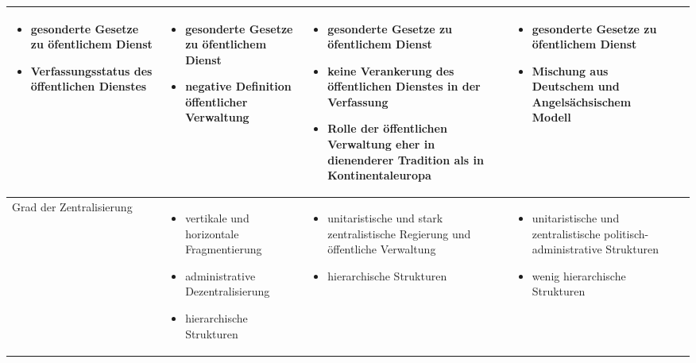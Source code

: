 \begin{landscape}
\begin{scriptsize}
\begin{longtable}[H]{|L{4cm}|L{5cm}|L{5cm}|L{5cm}|L{4cm}|}
\begin{itemize}
\item gesonderte Gesetze zu öfentlichem Dienst
\item Verfassungsstatus des öffentlichen Dienstes
\end{itemize}
&
\begin{itemize}
\item gesonderte Gesetze zu öfentlichem Dienst            
\item negative Definition öffentlicher Verwaltung 
\end{itemize}
&
 \vspace{-2mm}
\begin{itemize}
\item gesonderte Gesetze zu öfentlichem Dienst
\item keine Verankerung des öffentlichen Dienstes in der Verfassung
\item Rolle der öffentlichen Verwaltung eher in dienenderer Tradition als in Kontinentaleuropa
 \end{itemize}
\vspace{-3mm}
&
\begin{itemize}
\item gesonderte Gesetze zu öfentlichem Dienst            
\item Mischung aus Deutschem und Angelsächsischem Modell
\end{itemize}\\\hline
Grad der Zentralisierung&
 \vspace{-2mm}
\begin{itemize}
\item vertikale und horizontale Fragmentierung
\item administrative Dezentralisierung
\item hierarchische Strukturen
\end{itemize}
 \vspace{-2mm}
&
\vspace{-1mm}
\begin{itemize}
\item unitaristische und stark zentralistische Regierung und öffentliche Verwaltung
\item hierarchische Strukturen
\end{itemize}
\vspace{-1mm}
 &
\vspace{-1mm}
\begin{itemize}
\item unitaristische und zentralistische politisch-administrative Strukturen
\item wenig hierarchische Strukturen 	

\end{itemize}
\end{longtable}
\end{scriptsize}
\end{landscape}
